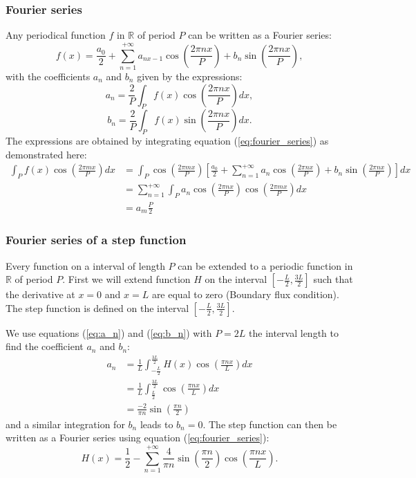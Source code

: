 \documentclass[sn-basic, Numbered]{sn-jnl}
\begin{document}
\subsubsection{Fourier series}
Any periodical function $f$ in $\mathbb{R}$ of period $P$ can be written as a Fourier series:
\begin{equation}
    f(x) =  \frac{a_0}{2} + \sum_{n=1}^{+\infty} a_{nx-1} \cos\left(\frac{2\pi n x}{P}\right) + b_n \sin\left(\frac{2\pi n x}{P}\right),
    \label{eq:fourier_series}
\end{equation}
with the coefficients $a_n$ and $b_n$ given by the expressions:
\begin{equation}
    a_n = \frac{2}{P} \int_P f(x) \cos\left(\frac{2\pi n x}{P}\right) dx,
    \label{eq:a_n}
\end{equation}
\begin{equation}
    b_n = \frac{2}{P} \int_P f(x) \sin\left(\frac{2\pi n x}{P}\right) dx.
    \label{eq:b_n}
\end{equation}
The expressions are obtained by integrating equation (\ref{eq:fourier_series}) as demonstrated here:
\begin{align*}
    \int_P f(x) \cos\left(\frac{2\pi m x}{P}\right) dx & =  \int_P  \cos\left(\frac{2\pi m x}{P}\right)\left[ \frac{a_0}{2} + \sum_{n=1}^{+\infty} a_n \cos\left(\frac{2\pi n x}{P}\right) + b_n \sin\left(\frac{2\pi n x}{P}\right) \right] dx \\
    &=  \sum_{n=1}^{+\infty} \int_P  a_n \cos\left(\frac{2\pi n x}{P}\right)  \cos\left(\frac{2\pi m x}{P}\right) dx \\
    &= a_m \frac{P}{2}
\end{align*}

\subsubsection{Fourier series of a step function}
Every function on a interval of length $P$ can be extended to a periodic function in $\mathbb{R}$ of period $P$.
First we will extend function $H$ on the interval $[-\frac{L}{2}, \frac{3L}{2}]$ such that the derivative at $x=0$ and $x=L$ are equal to zero (Boundary flux condition). 
The step function is defined on the interval $[-\frac{L}{2}, \frac{3L}{2}]$.

We use equations (\ref{eq:a_n}) and (\ref{eq:b_n}) with $P=2L$ the interval length to find the coefficient $a_n$ and $b_n$:
\begin{align*}
    a_n &= \frac{1}{L} \int_{-\frac{L}{2}}^{\frac{3L}{2}} H(x) \cos\left(\frac{\pi n x}{L}\right) dx \\
    & = \frac{1}{L} \int_{\frac{L}{2}}^{\frac{3L}{2}} \cos\left(\frac{\pi n x}{L}\right) dx \\
    & = \frac{-2}{\pi n} \sin\left( \frac{\pi n}{2} \right)
\end{align*}
and a similar integration for $b_n$ leads to $b_n=0$.
The step function can then be written as a Fourier series using equation (\ref{eq:fourier_series}):
\begin{equation}
    H(x) = \frac{1}{2} - \sum_{n=1}^{+\infty} \frac{4}{\pi n} \sin\left(\frac{\pi n }{2} \right) \cos\left(\frac{\pi n x}{L}\right).
\end{equation}
\end{document}
